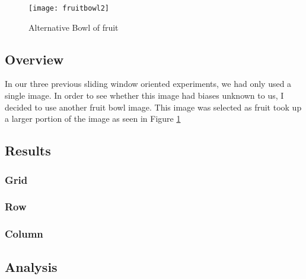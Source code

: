 \begin{figure}
    \texttt{[image: fruitbowl2]}
    \caption{Alternative Bowl of fruit}
    \label{fig:newFruit}
\end{figure}

\subsection*{Overview}
In our three previous sliding window oriented experiments, we had only used a
single image. In order to see whether this image had biases unknown
to us, I decided to use another fruit bowl image. This image was selected as
fruit took up a larger portion of the image as seen in Figure \ref{fig:newFruit}

\subsection*{Results}
\subsubsection*{Grid}
\subsubsection*{Row}
\subsubsection*{Column}

\subsection*{Analysis}
